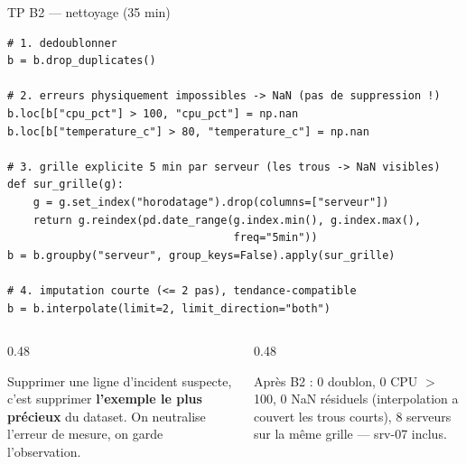 \begin{frame}[fragile]{TP B2 --- nettoyage (35 min)}
\begin{codebox}
\begin{lstlisting}
# 1. dedoublonner
b = b.drop_duplicates()

# 2. erreurs physiquement impossibles -> NaN (pas de suppression !)
b.loc[b["cpu_pct"] > 100, "cpu_pct"] = np.nan
b.loc[b["temperature_c"] > 80, "temperature_c"] = np.nan

# 3. grille explicite 5 min par serveur (les trous -> NaN visibles)
def sur_grille(g):
    g = g.set_index("horodatage").drop(columns=["serveur"])
    return g.reindex(pd.date_range(g.index.min(), g.index.max(),
                                   freq="5min"))
b = b.groupby("serveur", group_keys=False).apply(sur_grille)

# 4. imputation courte (<= 2 pas), tendance-compatible
b = b.interpolate(limit=2, limit_direction="both")
\end{lstlisting}
\end{codebox}
\begin{columns}[t]
\begin{column}{0.48\textwidth}
\begin{wbox}
Supprimer une ligne d'incident suspecte, c'est supprimer
\textbf{l'exemple le plus précieux} du dataset. On neutralise
l'erreur de mesure, on garde l'observation.
\end{wbox}
\end{column}
\begin{column}{0.48\textwidth}
\begin{ebox}
Après B2 : 0 doublon, 0 CPU $>$ 100, 0 NaN résiduels
(interpolation a couvert les trous courts), 8 serveurs
sur la même grille --- srv-07 inclus.
\end{ebox}
\end{column}
\end{columns}
\end{frame}

